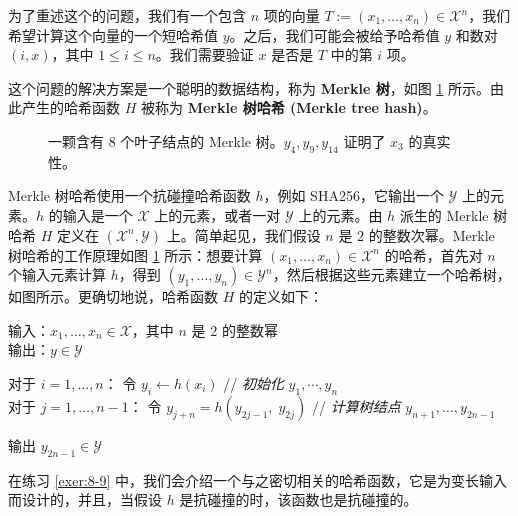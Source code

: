 \begin{snote}[Merkle 树。]
为了重述这个的问题，我们有一个包含 $n$ 项的向量 $T:=(x_1,\dots,x_n)\in\mathcal{X}^n$，我们希望计算这个向量的一个短哈希值 $y$。之后，我们可能会被给予哈希值 $y$ 和数对 $(i,x)$，其中 $1\leq i\leq n$。我们需要验证 $x$ 是否是 $T$ 中的第 $i$ 项。

这个问题的解决方案是一个聪明的数据结构，称为 \textbf{Merkle 树}，如图 \ref{fig:8-12} 所示。由此产生的哈希函数 $H$ 被称为 \textbf{Merkle 树哈希 (Merkle tree hash)}。

\begin{figure}
	\centering
	
	\caption{一颗含有 $8$ 个叶子结点的 Merkle 树。$y_4,y_9,y_{14}$ 证明了 $x_3$ 的真实性。}
	\label{fig:8-12}
\end{figure}

Merkle 树哈希使用一个抗碰撞哈希函数 $h$，例如 SHA256，它输出一个 $\mathcal{Y}$ 上的元素。$h$ 的输入是一个 $\mathcal{X}$ 上的元素，或者一对 $\mathcal{Y}$ 上的元素。由 $h$ 派生的 Merkle 树哈希 $H$ 定义在 $(\mathcal{X}^n,\mathcal{Y})$ 上。简单起见，我们假设 $n$ 是 $2$ 的整数次幂。Merkle 树哈希的工作原理如图 \ref{fig:8-12} 所示：想要计算 $(x_1,\dots,x_n)\in\mathcal{X}^n$ 的哈希，首先对 $n$ 个输入元素计算 $h$，得到 $(y_1,\dots,y_n)\in\mathcal{Y}^n$，然后根据这些元素建立一个哈希树，如图所示。更确切地说，哈希函数 $H$ 的定义如下：

\vspace{5pt}

\hspace*{5pt} 输入：$x_1,\dots,x_n\in\mathcal{X}$，其中 $n$ 是 $2$ 的整数幂\\
\hspace*{26pt} 输出：$y\in\mathcal{Y}$

\vspace{5pt}

\hspace*{5pt} 对于 $i=1,\dots,n$：
\hspace*{24pt} 令 $y_i\leftarrow h(x_i)$
\hspace*{65.5pt} // \emph{初始化} $y_1,\cdots,y_n$\\
\hspace*{26pt} 对于 $j=1,\dots,n-1$：
\hspace*{5pt} 令 $y_{j+n}=h(y_{2j-1},\;y_{2j})$
\hspace*{20pt} // \emph{计算树结点} $y_{n+1},\dots,y_{2n-1}$

\vspace{5pt}

\hspace*{5pt} 输出 $y_{2n-1}\in\mathcal{Y}$

\vspace{5pt}

在练习 \ref{exer:8-9} 中，我们会介绍一个与之密切相关的哈希函数，它是为变长输入而设计的，并且，当假设 $h$ 是抗碰撞的时，该函数也是抗碰撞的。
\end{snote}


